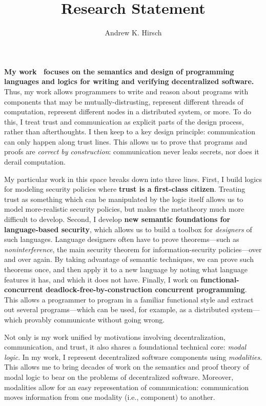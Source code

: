 \documentclass{article}
\author{Andrew K. Hirsch}
\title{Research Statement}
\date{}
\theoremstyle{definition}
\begin{document}
\maketitle

\textbf{My work~\citep{SilverHHCZ22,MenzHLG22,HirschG22,HirschC21,HirschACAT20,HirschT18,HirschC13} focuses on the semantics and design of programming languages and logics for writing and verifying decentralized software.}
Thus, my work allows programmers to write and reason about programs with components that may be mutually-distrusting, represent different threads of computation, represent different nodes in a distributed system, or more.
To do this, I treat trust and communication as explicit parts of the design process, rather than afterthoughts.
I then keep to a key design principle: communication can only happen along trust lines.
This allows us to prove that programs and proofs are \emph{correct by construction}: communication never leaks secrets, nor does it derail computation.

My particular work in this space breaks down into three lines.
First, I build logics for modeling security policies where \textbf{trust is a first-class citizen}.
Treating trust as something which can be manipulated by the logic itself allows us to model more-realistic security policies, but makes the metatheory much more difficult to develop.
Second, I develop \textbf{new semantic foundations for language-based security}, which allows us to build a toolbox for \emph{designers} of such languages.
Language designers often have to prove theorems---such as \emph{noninterference}, the main security theorem for information-security policies---over and over again.
By taking advantage of semantic techniques, we can prove such theorems once, and then apply it to a new language by noting what language features it has, and which it does not have.
Finally, I work on \textbf{functional-concurrent deadlock-free-by-construction concurrent programming}.
This allows a programmer to program in a familiar functional style and extract out several programs---which can be used, for example, as a distributed system---which provably communicate without going wrong.

Not only is my work unified by motivations involving decentralization, communication, and trust, it also shares a foundational technical core: \emph{modal logic}.
In my work, I represent decentralized software components using \emph{modalities}.
This allows me to bring decades of work on the semantics and proof theory of modal logic to bear on the problems of decentralized software.
Moreover, modalities allow for an easy representation of communication: communication moves information from one modality (i.e., component) to another.
\end{document}
